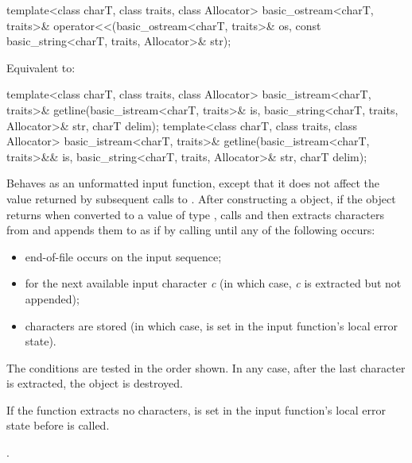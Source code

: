 %
\begin{itemdecl}
template<class charT, class traits, class Allocator>
  basic_ostream<charT, traits>&
    operator<<(basic_ostream<charT, traits>& os,
               const basic_string<charT, traits, Allocator>& str);
\end{itemdecl}

\begin{itemdescr}
\pnum
\effects
Equivalent to: 
\end{itemdescr}

%
\begin{itemdecl}
template<class charT, class traits, class Allocator>
  basic_istream<charT, traits>&
    getline(basic_istream<charT, traits>& is,
            basic_string<charT, traits, Allocator>& str,
            charT delim);
template<class charT, class traits, class Allocator>
  basic_istream<charT, traits>&
    getline(basic_istream<charT, traits>&& is,
            basic_string<charT, traits, Allocator>& str,
            charT delim);
\end{itemdecl}

\begin{itemdescr}
\pnum
\effects
Behaves as an unformatted input function,
except that it does not affect the value returned by subsequent calls to
.
After constructing a  object,
if the  object returns 
when converted to a value of type ,
calls 
and then extracts characters from  and appends them
to  as if by calling
until any of the following occurs:
\begin{itemize}
\item
end-of-file occurs on the input sequence;
\item
{}
for the next available input character
\textit{c}
(in which case,
\textit{c}
is extracted but not appended);
\item
{}
characters are stored
(in which case,
 is set in the input function's local error state).
\end{itemize}

\pnum
The conditions are tested in the order shown.
In any case,
after the last character is extracted, the
object is destroyed.

\pnum
If the function extracts no characters,
 is set in the input function's local error state
before  is called.

\pnum
\returns
{}.
\end{itemdescr}

